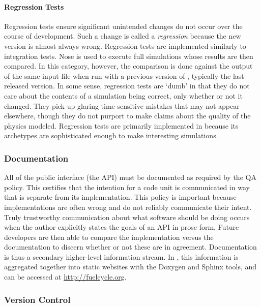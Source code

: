 \paragraph{Regression Tests}

Regression tests ensure significant unintended changes do not
occur over the course of \Cyclus development. Such a change is called a
\emph{regression} because the new version is almost always wrong.
Regression tests are implemented similarly to integration tests.
Nose is used to execute full \Cyclus simulations whose results
are then compared. In this category, however, the comparison is done against
the output of the same input file when run with a previous version of \Cyclus,
typically the last released version.
In some sense, regression tests are `dumb' in that they do
not care about the contents of a simulation being correct, only whether or not
it changed. They pick up glaring time-sensitive mistakes that may
not appear elsewhere, though they do not purport to make claims about the
quality of the physics modeled. Regression tests are primarily implemented
in \Cycamore because its archetypes are sophisticated enough
to make interesting simulations.

\subsubsection{Documentation}

All of the public interface (the \gls{API}) must be documented as required by the \Cyclus
\gls{QA} policy. This certifies that the intention for a code unit is communicated
in way that is separate from its implementation. This policy is important
because implementations are often wrong and do not reliably communicate their intent. Truly trustworthy communication about what
software should be doing occurs when the author explicitly states the
goals of an \gls{API} in prose form. Future developers are then able to
compare the implementation versus the documentation to discern whether or not
these are in agreement. Documentation is thus a secondary higher-level information
stream.  In \Cyclus, this information is aggregated together into static
websites with the Doxygen \cite{van_heesch_doxygen:_2008} and Sphinx
\cite{brandl_sphinx_2014}
tools, and can be accessed at \url{http://fuelcycle.org}.

\subsubsection{Version Control}

